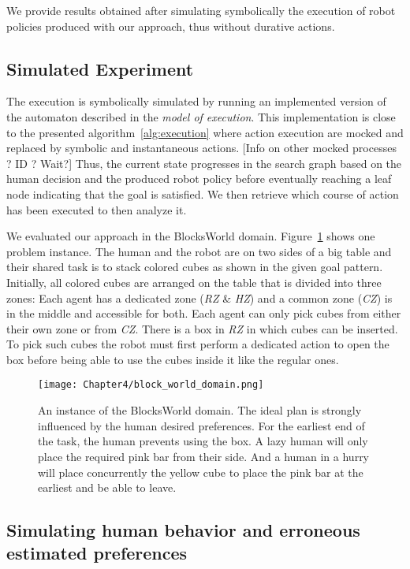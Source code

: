 We provide results obtained after simulating symbolically the execution of robot policies produced with our approach, thus without durative actions. 

    \subsection{Simulated Experiment}

The execution is symbolically simulated by running an implemented version of the automaton described in the \textit{model of execution}. This implementation is close to the presented algorithm~\ref{alg:execution} where action execution are mocked and replaced by symbolic and instantaneous actions. [Info on other mocked processes ? ID ? Wait?]
Thus, the current state progresses in the search graph based on the human decision and the produced robot policy before eventually reaching a leaf node indicating that the goal is satisfied. 
We then retrieve which course of action has been executed to then analyze it.

We evaluated our approach in the BlocksWorld domain. Figure~\ref{fig:block_world_domain} shows one problem instance. 
The human and the robot are on two sides of a big table and their shared task is to stack colored cubes as shown in the given goal pattern. 
Initially, all colored cubes are arranged on the table that is divided into three zones: Each agent has a dedicated zone (\textit{RZ} \& \textit{HZ}) and a common zone (\textit{CZ}) is in the middle and accessible for both. 
Each agent can only pick cubes from either their own zone or from \textit{CZ}. 
There is a box in \textit{RZ} in which cubes can be inserted. To pick such cubes the robot must first perform a dedicated action to open the box before being able to use the cubes inside it like the regular ones.


\begin{figure}
    \centering
    \texttt{[image: Chapter4/block\_world\_domain.png]}
    \caption{An instance of the BlocksWorld domain. The ideal plan is strongly influenced by the human desired  preferences. For the earliest end of the task, the human prevents using the box. A lazy human will only place the required pink bar from their side. And a human in a hurry will place concurrently the yellow cube to place the pink bar at the earliest and be able to leave.}
    \label{fig:block_world_domain}
\end{figure}


    \subsection{Simulating human behavior and erroneous estimated preferences}

